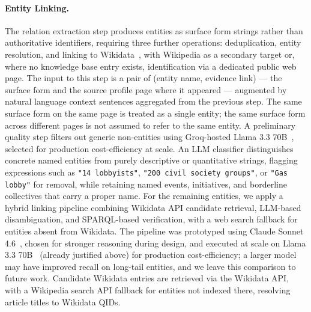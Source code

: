 \paragraph{Entity Linking.}
The relation extraction step produces entities as surface form strings rather than authoritative identifiers, requiring three further operations: deduplication, entity resolution, and linking to Wikidata~\cite{wikidata}, with Wikipedia as a secondary target or, where no knowledge base entry exists, identification via a dedicated public web page.
The input to this step is a pair of (entity name, evidence link) — the surface form and the source profile page where it appeared — augmented by natural language context sentences aggregated from the previous step.
The same surface form on the same page is treated as a single entity; the same surface form across different pages is not assumed to refer to the same entity.
A preliminary quality step filters out generic non-entities using Groq-hosted Llama 3.3 70B~\cite{llama33}, selected for production cost-efficiency at scale.
An LLM classifier distinguishes concrete named entities from purely descriptive or quantitative strings, flagging expressions such as \texttt{"14 lobbyists"}, \texttt{"200 civil society groups"}, or \texttt{"Gas lobby"} for removal, while retaining named events, initiatives, and borderline collectives that carry a proper name.
For the remaining entities, we apply a hybrid linking pipeline combining Wikidata API candidate retrieval, LLM-based disambiguation, and SPARQL-based verification, with a web search fallback for entities absent from Wikidata.
The pipeline was prototyped using Claude Sonnet 4.6~\cite{claudesonnet46}, chosen for stronger reasoning during design, and executed at scale on Llama 3.3 70B~\cite{llama33} (already justified above) for production cost-efficiency; a larger model may have improved recall on long-tail entities, and we leave this comparison to future work.
Candidate Wikidata entries are retrieved via the Wikidata API, with a Wikipedia search API fallback for entities not indexed there, resolving article titles to Wikidata QIDs.
